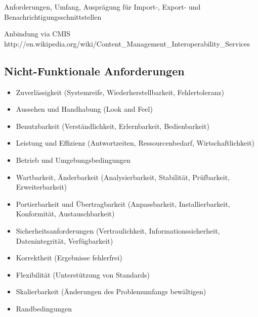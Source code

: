 Anforderungen, Umfang, Ausprägung für Import-, Export- und Benachrichtigungsschnittstellen

Anbindung via CMIS http://en.wikipedia.org/wiki/Content\_Management\_Interoperability\_Services

\subsection{Nicht-Funktionale Anforderungen}\label{l:nicht-funktionale-anforderungen}

\begin{itemize}
\item Zuverlässigkeit (Systemreife, Wiederherstellbarkeit, Fehlertoleranz)
\item Aussehen und Handhabung (Look and Feel)
\item Benutzbarkeit (Verständlichkeit, Erlernbarkeit, Bedienbarkeit)
\item Leistung und Effizienz (Antwortzeiten, Ressourcenbedarf, Wirtschaftlichkeit)
\item Betrieb und Umgebungsbedingungen
\item Wartbarkeit, Änderbarkeit (Analysierbarkeit, Stabilität, Prüfbarkeit, Erweiterbarkeit)
\item Portierbarkeit und Übertragbarkeit (Anpassbarkeit, Installierbarkeit, Konformität, Austauschbarkeit)
\item Sicherheitsanforderungen (Vertraulichkeit, Informationssicherheit, Datenintegrität, Verfügbarkeit)
\item Korrektheit (Ergebnisse fehlerfrei)
\item Flexibilität (Unterstützung von Standards)
\item Skalierbarkeit (Änderungen des Problemumfangs bewältigen)
\item Randbedingungen
\end{itemize}
